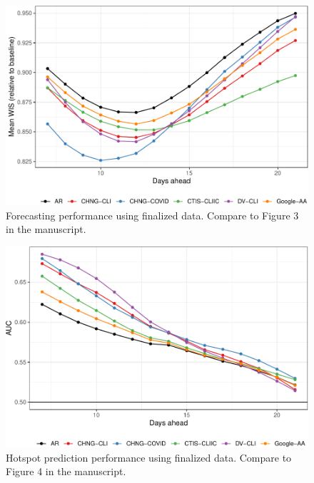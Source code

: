 \documentclass[9pt,twoside,lineno]{pnas-new}
\begin{document}
\begin{figure}

{\centering \includegraphics[width=\textwidth]{fig/fcast-finalized-1} 

}

\caption{Forecasting performance using finalized data. Compare to Figure 3 in the manuscript.}\label{fig:fcast-finalized}
\end{figure}

\clearpage

\begin{figure}

{\centering \includegraphics[width=\textwidth]{fig/hot-finalized-1} 

}

\caption{Hotspot prediction performance using finalized data. Compare to Figure 4 in the manuscript.}\label{fig:hot-finalized}
\end{figure}
\end{document}
